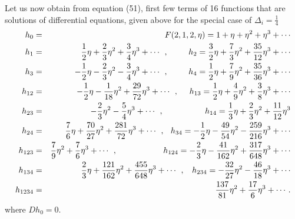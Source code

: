 \documentclass[a4paper,11pt]{article}
\begin{document}
Let us now obtain from equation (51), first few terms of 16
functions that are solutions of differential equations, given
above for the special case of $\Delta_{i}=\frac{1}{4}$
\begin{eqnarray}
h_{0}&=& F(2,1,2,\eta)=1+\eta+\eta^{2}+\eta^{3}+\cdots\nonumber\\
h_{1}&=&\:\:\:\frac{1}{2}\eta+\frac{2}{3}\eta^{2}+\frac{3}{4}\eta^{3}+\cdots\:\:,\:\:\:\:\:\:\hspace{4mm}h_{2}=\frac{3}{2}\eta+\frac{7}{3}\eta^{2}+\frac{35}{12}\eta^{3}+\cdots\nonumber\\
h_{3}&=&-\frac{1}{2}\eta-\frac{2}{3}\eta^{2}-\frac{3}{4}\eta^{3}+\cdots\:\:,\:\:\:\:\:\:\hspace{4mm}h_{4}=\frac{1}{2}\eta+\frac{7}{9}\eta^{2}+\frac{35}{36}\eta^{3}+\cdots\nonumber\\
h_{12}&=&-\frac{1}{2}\eta-\frac{1}{18}\eta^{2}+\frac{29}{72}\eta^{3}+\cdots\:\:,\:\:\:\:\:\:h_{13}=\frac{1}{2}\eta+\frac{4}{9}\eta^{2}+\frac{3}{8}\eta^{3}+\cdots\nonumber\\
h_{23}&=&-\frac{2}{3}\eta^{2}-\frac{5}{4}\eta^{3}+\cdots\:\:,\:\:\:\:\:\:\hspace{13mm}
h_{14}=\frac{1}{3}\eta+\frac{2}{3}\eta^{2}+\frac{11}{12}\eta^{3}\nonumber\\
h_{24}&=&\frac{7}{6}\eta+\frac{70}{27}\eta^{2}+\frac{281}{72}\eta^{3}+\cdots\:\:,\:\:\hspace{1mm}h_{34}=-\frac{1}{2}\eta-\frac{49}{54}\eta^{2}-\frac{259}{216}\eta^{3}+\cdots\nonumber\\
h_{123}&=&\frac{7}{9}\eta^{2}+\frac{7}{6}\eta^{3}+\cdots\:\:,\:\:\:\:\:\:\hspace{15mm}h_{124}=-\frac{2}{3}\eta-\frac{41}{162}\eta^{2}+\frac{317}{648}\eta^{3}+\cdots\nonumber\\
h_{134}&=&\frac{2}{3}\eta+\frac{121}{162}\eta^{2}+\frac{455}{648}\eta^{3}+\cdots\:\:,\:\:\:\:h_{234}=-\frac{32}{27}\eta^{2}-\frac{46}{18}\eta^{3}+\cdots\nonumber\\
h_{1234}&=&\frac{137}{81}\eta^{2}+\frac{17}{6}\eta^{3}+\cdots.
\end{eqnarray}
where $Dh_{0}=0$.
\end{document}
